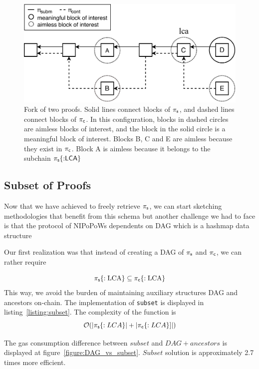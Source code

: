 \begin{figure}[H]
    \begin{center}
        \includegraphics[width=0.6\columnwidth]{figures/boi-position.pdf}
    \end{center}
    \caption{Fork of two proofs.
    Solid lines connect blocks of $\mathsf{\pi_{s}}$,
    and dashed lines connect blocks of $\mathsf{\pi_{c}}$.
    In this configuration,
    blocks in dashed circles are aimless blocks of interest, and the block
    in the solid circle is a meaningful block of interest. Blocks B, C and E are
    aimless because they exist in $\mathsf{\pi_{c}}$. Block A is aimless because it
    belongs to the subchain $\mathsf{\pi_{s}}\{{:}\mathsf{LCA}\}$
    }
    \label{fig:boi-position}
\end{figure}

\subsection{Subset of Proofs}

Now that we have achieved to freely retrieve $\mathsf{\pi_{s}}$, we can start
sketching methodologies that benefit from this schema but another challenge we
had to face is that the protocol of NIPoPoWs dependents on DAG which is a
hashmap data structure

Our first realization was that instead of creating a DAG of $\mathsf{\pi_{s}}$ and
$\mathsf{\pi_{c}}$, we can rather require

\[ \mathsf{\pi_{s}}\{:\textrm{LCA}\} \subseteq \mathsf{\pi_{c}}\{:\textrm{LCA}\} \]
This way, we avoid the burden of maintaining auxiliary structures DAG and
ancestors on-chain. The implementation of \texttt{subset} is displayed in
listing~\ref{listing:subset}. The complexity of the function is \[
\mathcal{O}(|\mathsf{\pi_{s}}\{:LCA\}| + |\mathsf{\pi_{c}}\{:LCA\}]|) \]





The gas consumption difference between $subset$ and $DAG+ancestors$ is
displayed at figure~\ref{figure:DAG_vs_subset}. $Subset$ solution is
approximately 2.7 times more efficient.

